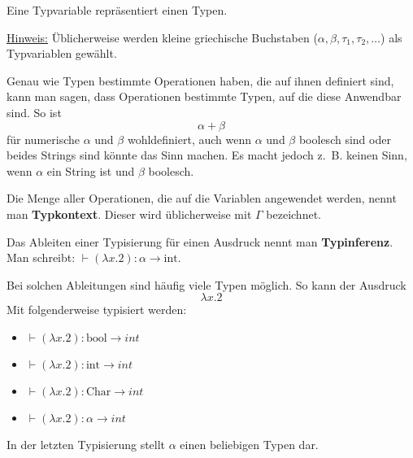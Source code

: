 \begin{definition}[Typvariable]%
	Eine Typvariable repräsentiert einen Typen.
\end{definition}

\underline{Hinweis:} Üblicherweise werden kleine griechische Buchstaben ($\alpha, \beta, \tau_1, \tau_2, \dots$) als Typvariablen gewählt.

Genau wie Typen bestimmte Operationen haben, die auf ihnen definiert sind, 
kann man sagen, dass Operationen bestimmte Typen, auf die diese Anwendbar sind. So ist
\[\alpha+\beta\]
für numerische $\alpha$ und $\beta$ wohldefiniert, auch wenn $\alpha$ und $\beta$ boolesch sind
oder beides Strings sind könnte das Sinn machen. Es macht jedoch z.~B. keinen Sinn,
wenn $\alpha$ ein String ist und $\beta$ boolesch.

Die Menge aller Operationen, die auf die Variablen angewendet werden, nennt man
\textbf{Typkontext}. Dieser wird üblicherweise mit $\Gamma$
bezeichnet.

Das Ableiten einer Typisierung für einen Ausdruck nennt man \textbf{Typinferenz}.
Man schreibt: $\vdash(\lambda x.2): \alpha \rightarrow \text{int}$.

Bei solchen Ableitungen sind häufig viele Typen möglich. So kann der Ausdruck
\[\lambda x.2\]
Mit folgenderweise typisiert werden:
\begin{itemize}
	\item $\vdash(\lambda x.2): \text{bool} \rightarrow int$
	\item $\vdash(\lambda x.2): \text{int} \rightarrow int$
	\item $\vdash(\lambda x.2): \text{Char} \rightarrow int$
	\item $\vdash(\lambda x.2): \alpha \rightarrow int$
\end{itemize}

In der letzten Typisierung stellt $\alpha$ einen beliebigen Typen dar.

